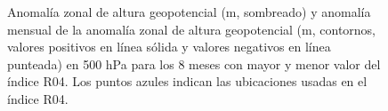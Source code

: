 \documentclass[12pt,oneside,a4paper]{reedthesis}
\begin{document}
\begin{figure}

{\centering {}\newline{}

}

\caption{Anomalía zonal de altura geopotencial (m, sombreado) y anomalía mensual de la anomalía zonal de altura geopotencial (m, contornos, valores positivos en línea sólida y valores negativos en línea punteada) en 500 hPa para los 8 meses con mayor y menor valor del índice R04. Los puntos azules indican las ubicaciones usadas en el índice R04.}\label{fig:raphael-top8}
\end{figure}
\end{document}
